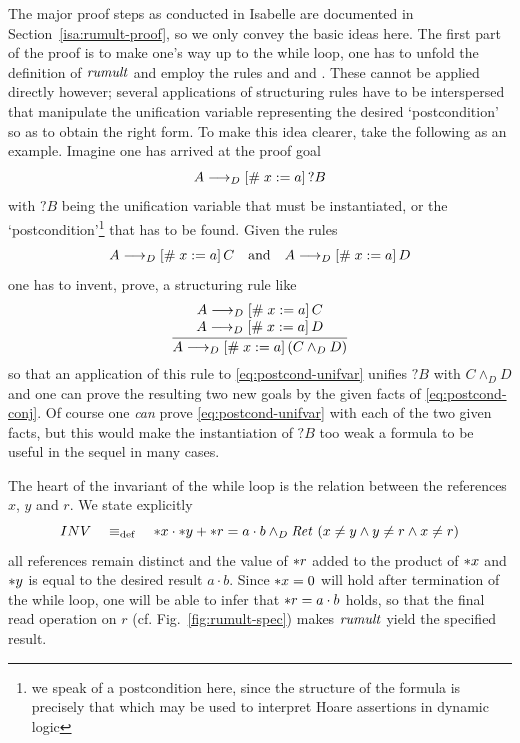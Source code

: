 The major proof steps as conducted in Isabelle are documented in
Section~\ref{isa:rumult-proof}, so we only convey the basic ideas here. The
first part of the proof is to make one's way up to the while loop, \IE one has
to unfold the definition of $\mathit{rumult}$ and employ the rules
 and  and . These
cannot be applied directly however; several applications of structuring rules
have to be interspersed that manipulate the unification variable representing
the desired `postcondition' so as to obtain the right form. To make this idea
clearer, take the following  as an example. Imagine one has arrived at the
proof goal
\begin{equation}\label{eq:postcond-unifvar}
  A \longrightarrow_D [\#\;x := a]\,{?B}
\end{equation}
with $?B$ being the unification variable that must be instantiated, or the
`postcondition'\footnote{we speak of a postcondition here, since the structure
  of the formula is precisely that which may be used to interpret Hoare
  assertions in dynamic logic} that has to be found. Given the rules
\begin{equation} \label{eq:postcond-conj}
  A \longrightarrow_D [\#\;x := a]\,{C} \quad\text{and}\quad A \longrightarrow_D [\#\;x := a]\,{D}
\end{equation}
one has to invent, \IE prove, a structuring rule like
\[
\frac{\displaystyle \begin{array}{cc}
        A \longrightarrow_D [\#\;x := a]\,{C}\\
        A \longrightarrow_D [\#\;x := a]\,{D}
      \end{array}}{\displaystyle A \longrightarrow_D [\#\;x := a]\,{(C \land_D D)}}
\]
so that an application of this rule to \eqref{eq:postcond-unifvar} unifies $?B$
with $C \land_D D$ and one can prove the resulting two new goals by the given facts
of \eqref{eq:postcond-conj}. Of course one \emph{can} prove
\eqref{eq:postcond-unifvar} with each of the two given facts, but this would 
make the instantiation of $?B$ too weak a formula to be useful in the sequel in
many cases.

The heart of the invariant of the while loop is the relation between the
references $x$, $y$ and $r$. We state explicitly
\[
  INV \quad\equiv_{\mathrm{def}}\quad {\ast x} \cdot {\ast y} + {\ast r} = a \cdot b \land_D \mathit{Ret}\ (x \neq y \land y\neq r \land
  x\neq r)
\]
\IE all references remain distinct and the value of ${\ast r}$ added to the
product of ${\ast x}$ and ${\ast y}$ is equal to the desired result $a \cdot b$. Since
${\ast x} = 0$ will hold after termination of the while loop, one will be able to
infer that ${\ast r} = a \cdot b$ holds, so that the final read operation on $r$ (cf.
Fig.~\ref{fig:rumult-spec}) makes $\mathit{rumult}$ yield the specified result.

